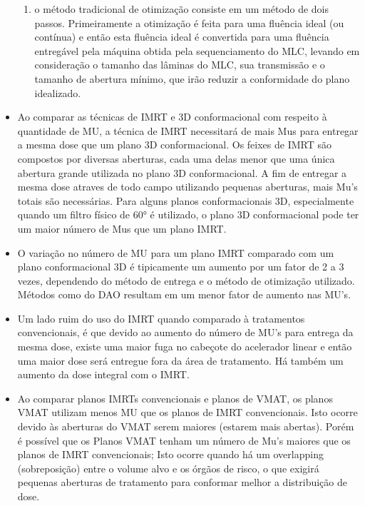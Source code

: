\documentclass[11pt,a4paper]{article}
\newcounter{exemplo}
\begin{document}
\begin{exemplo}
\begin{itemize}
\begin{enumerate}[label=\textcolor{CarnationPink}{\roman*.}]
                \item o método tradicional de otimização consiste em um método de dois passos. Primeiramente a otimização é feita para uma fluência ideal (ou contínua) e então esta fluência ideal é convertida para uma fluência entregável pela máquina obtida pela sequenciamento do MLC, levando em consideração o tamanho das lâminas do MLC, sua transmissão e o tamanho de abertura mínimo, que irão reduzir a conformidade do plano idealizado.
            \end{enumerate}

        \item Ao comparar as técnicas de IMRT e 3D conformacional com respeito à quantidade de MU, a técnica de IMRT necessitará de mais Mus para entregar a mesma dose que um plano 3D conformacional. Os feixes de IMRT são compostos por diversas aberturas, cada uma delas menor que uma única abertura grande utilizada no plano 3D conformacional. A fim de entregar a mesma dose atraves de todo campo utilizando pequenas aberturas, mais Mu's totais são necessárias. Para alguns planos conformacionais 3D, especialmente quando um filtro físico de \ang{60} é utilizado, o plano 3D conformacional pode ter um maior número de Mus que um plano IMRT. 
        
        \item O variação no número de MU para um plano IMRT comparado com um plano conformacional 3D é tipicamente um aumento por um fator de 2 a 3 vezes, dependendo do método de entrega e o método de otimização utilizado. Métodos como do DAO resultam em um menor fator de aumento nas MU's.
        
        \item Um lado ruim do uso do IMRT quando comparado à tratamentos convencionais, é que devido ao aumento do número de MU's para entrega da mesma dose, existe uma maior fuga no cabeçote do acelerador linear e então uma maior dose será entregue fora da área de tratamento. Há também um aumento da dose integral com o IMRT.
        
        \item Ao comparar planos IMRTs convencionais e planos de VMAT, os planos VMAT utilizam menos MU que os planos de IMRT convencionais. Isto ocorre devido às aberturas do VMAT serem maiores (estarem mais abertas). Porém é possível que os Planos VMAT tenham um número de Mu's maiores que os planos de IMRT convencionais; Isto ocorre quando há um overlapping (sobreposição) entre o volume alvo e os órgãos de risco, o que exigirá pequenas aberturas de tratamento para conformar melhor a distribuição de dose. 
        

\end{itemize}
\end{exemplo}
\end{document}
